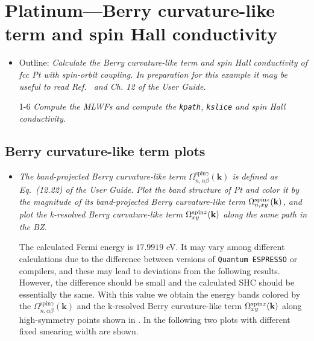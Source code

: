 \section{Platinum---Berry curvature-like term and spin Hall conductivity}
\label{sec29:PtSHC}

\begin{itemize}
	\item Outline: {\it Calculate the Berry curvature-like term and spin Hall conductivity
	of fcc Pt with spin-orbit coupling. In preparation for this example it may be useful to read Ref.~ and Ch. 12 of the User Guide.}
\end{itemize}

\begin{itemize}
	\item[1-6] {\it Compute the MLWFs and compute the {\tt kpath}, {\tt kslice} and spin Hall conductivity.} 
\end{itemize}

\subsection*{Berry curvature-like term plots}
\begin{itemize}
	\item {\it The band-projected Berry curvature-like term $\Omega_{n,\alpha\beta}^{\text{spin} \gamma}({\bm k})$ 
		is defined as Eq.~(12.22) of the User Guide.}
	{\it Plot the band structure of Pt and color it 
		by the magnitude of its band-projected Berry curvature-like term $\Omega_{n,xy}^{\text{spin}z}(\bf k)$, 
		and plot the k-resolved Berry curvature-like term $\Omega_{xy}^{\text{spin}z}(\bf k)$ along the 
		same path in the BZ. }

	The calculated Fermi energy is $17.9919$ eV. It may vary among different calculations due to the difference between versions of {\tt Quantum ESPRESSO} or compilers, and these may lead to deviations from the following results. However, the difference should be small and the calculated SHC should be essentially the same. With this value we obtain the energy bands colored by the 
	$\Omega_{n,\alpha\beta}^{\text{spin} \gamma}({\bm k})$ and the k-resolved Berry curvature-like term $\Omega_{xy}^{\text{spin}z}(\bf k)$ along high-symmetry points shown in . 
	In the following two plots with different fixed smearing width are shown.
\end{itemize}

